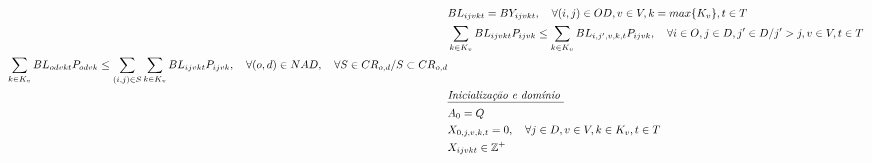\begin{align}
	 & BL_{ijvkt} = BY_{ijvkt}, \quad   \forall(i,j) \in OD, v \in V, k = max\{K_v\}, t \in T                                                                                                                         \label{eq: m1_binaria_BL_last}                                                                           \\
	 & \sum_{k \in K_v}BL_{ijvkt}P_{ijvk} \leq \sum_{k \in K_v}BL_{i,j',v,k,t}P_{ijvk}, \quad \forall i \in O, j \in D, j' \in D / j' > j, v \in V, t \in T                                                           \label{eq: m1_preco_estacao_inicio}                                                                              \\
	 \begin{split}
	 	& \sum_{k \in K_v}BL_{odvkt}P_{odvk} \leq \sum_{(i,j) \in S}\sum_{k \in K_v}BL_{ijvkt}P_{ijvk}, \quad    \forall (o,d) \in NAD, \quad  \forall S \in CR_{o,d} / S \subset CR_{o,d}\\
	\end{split}                                                                                                                                                                                                       \label{eq: m1_preco_combinacao_rotas_contidas}                                          \\
	 & \textit{\underline{Inicialização e domínio }}    \notag                                                                                                                                                                                                                                      \\
	 & A_{0} = Q                                                                                                                                                                                                      \label{eq: m1_ini_disponi}                                                    \\
	 & X_{0,j,v,k,t} = 0,     \quad \forall j \in D, v \in V, k \in K_v, t \in T                                                                                                                                      \label{eq: m1_ini_assig}                                                      \\
	 & X_{ijvkt} \in \mathbb{Z}^+                                                                                                                                                                                     \label{eq: m1_dom_assig}                                                      \\

\end{align}

